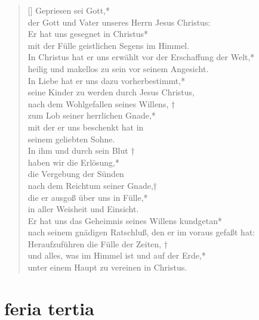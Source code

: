 \begin{verse}[\versewidth]
Gepriesen sei Gott,*\\
der Gott und Vater unseres Herrn Jesus Christus:\\
\vin Er hat uns gesegnet in Christus*\\
\vin mit der Fülle geistlichen Segens im Himmel.\\
In Christus hat er uns erwählt vor der Erschaffung der Welt,*\\
heilig und makellos zu sein vor seinem Angesicht.\\
\vin In Liebe hat er uns dazu vorherbestimmt,*\\
\vin seine Kinder zu werden durch Jesus Christus,\\
nach dem Wohlgefallen seines Willens, †\\
zum Lob seiner herrlichen Gnade,*\\
mit der er uns beschenkt hat in\\
seinem geliebten Sohne.\\
\vin In ihm und durch sein Blut †\\
\vin haben wir die Erlösung,*\\
\vin die Vergebung der Sünden\\
nach dem Reichtum seiner Gnade,†\\
die er ausgoß über uns in Fülle,*\\
in aller Weisheit und Einsicht.\\
\vin Er hat uns das Geheimnis seines Willens kundgetan*\\
\vin nach seinem gnädigen Ratschluß, den er im voraus gefaßt hat:\\
Heraufzuführen die Fülle der Zeiten, †\\
und alles, was im Himmel ist und auf der Erde,*\\
unter einem Haupt zu vereinen in Christus.\\

\end{verse}


\section{feria tertia}


